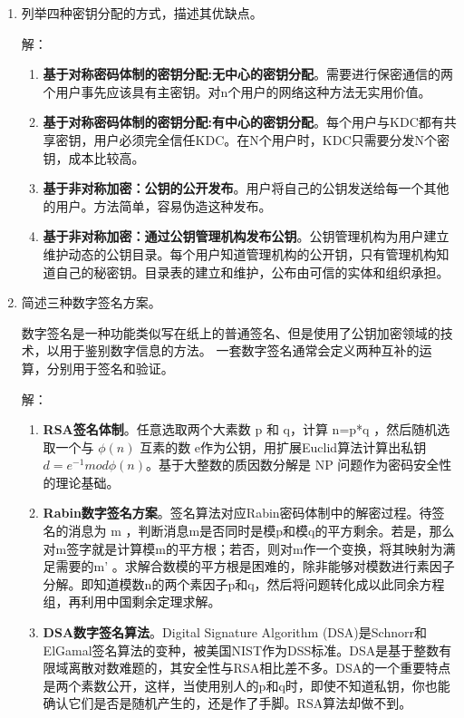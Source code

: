 \documentclass[degree=project,degree-type=project,cjk-font=noto]{thuthesis}
\begin{document}
\begin{enumerate}
\item 列举四种密钥分配的方式，描述其优缺点。

  {\heiti 解：}

\begin{enumerate}
  \item \textbf{基于对称密码体制的密钥分配:无中心的密钥分配}。需要进行保密通信的两个用户事先应该具有主密钥。对n个用户的网络这种方法无实用价值。
  \item \textbf{基于对称密码体制的密钥分配:有中心的密钥分配}。每个用户与KDC都有共享密钥，用户必须完全信任KDC。在N个用户时，KDC只需要分发N个密钥，成本比较高。
  \item \textbf{基于非对称加密：公钥的公开发布}。用户将自己的公钥发送给每一个其他的用户。方法简单，容易伪造这种发布。
  \item \textbf{基于非对称加密：通过公钥管理机构发布公钥}。公钥管理机构为用户建立维护动态的公钥目录。每个用户知道管理机构的公开钥，只有管理机构知道自己的秘密钥。目录表的建立和维护，公布由可信的实体和组织承担。
\end{enumerate}

\item 简述三种数字签名方案。

数字签名是一种功能类似写在纸上的普通签名、但是使用了公钥加密领域的技术，以用于鉴别数字信息的方法。
一套数字签名通常会定义两种互补的运算，分别用于签名和验证。

  {\heiti 解：}

\begin{enumerate}
  \item \textbf{RSA签名体制}。任意选取两个大素数 p 和 q，计算 n=p*q ，然后随机选取一个与 $\phi(n)$ 互素的数 e作为公钥，用扩展Euclid算法计算出私钥 $d=e^{−1} mod \phi(n)$。基于大整数的质因数分解是 NP 问题作为密码安全性的理论基础。
  \item \textbf{Rabin数字签名方案}。签名算法对应Rabin密码体制中的解密过程。待签名的消息为 m ，判断消息m是否同时是模p和模q的平方剩余。若是，那么对m签字就是计算模m的平方根；若否，则对m作一个变换，将其映射为满足需要的m’
。求解合数模的平方根是困难的，除非能够对模数进行素因子分解。即知道模数n的两个素因子p和q，然后将问题转化成以此同余方程组，再利用中国剩余定理求解。
  \item \textbf{DSA数字签名算法}。Digital Signature Algorithm (DSA)是Schnorr和ElGamal签名算法的变种，被美国NIST作为DSS标准。DSA是基于整数有限域离散对数难题的，其安全性与RSA相比差不多。DSA的一个重要特点是两个素数公开，这样，当使用别人的p和q时，即使不知道私钥，你也能确认它们是否是随机产生的，还是作了手脚。RSA算法却做不到。
\end{enumerate}


\end{enumerate}
\end{document}
